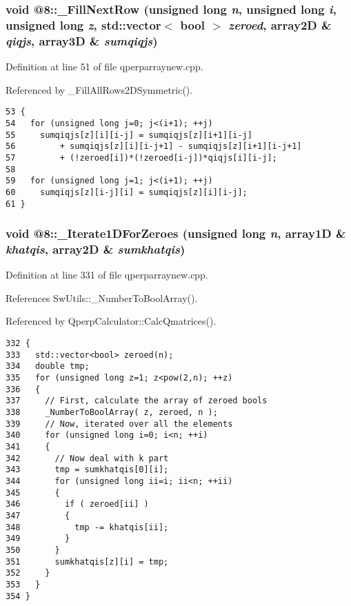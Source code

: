 \subsubsection{\setlength{\rightskip}{0pt plus 5cm}void @8::\_\-FillNextRow (unsigned long {\em n}, unsigned long {\em i}, unsigned long {\em z}, std::vector$<$ bool $>$ {\em zeroed}, array2D \& {\em qiqjs}, array3D \& {\em sumqiqjs})\hspace{0.3cm}{\tt  [static]}}\label{qperparraynew_8cpp_fa7bacdc3db3da4a62517d2518826fbc}




Definition at line 51 of file qperparraynew.cpp.

Referenced by \_\-FillAllRows2DSymmetric().

\begin{Code}\begin{verbatim}53 {
54   for (unsigned long j=0; j<(i+1); ++j)
55     sumqiqjs[z][i][i-j] = sumqiqjs[z][i+1][i-j] 
56         + sumqiqjs[z][i][i-j+1] - sumqiqjs[z][i+1][i-j+1] 
57         + (!zeroed[i])*(!zeroed[i-j])*qiqjs[i][i-j];
58 
59   for (unsigned long j=1; j<(i+1); ++j)
60     sumqiqjs[z][i-j][i] = sumqiqjs[z][i][i-j];
61 }
\end{verbatim}
\end{Code}


\subsubsection{\setlength{\rightskip}{0pt plus 5cm}void @8::\_\-Iterate1DForZeroes (unsigned long {\em n}, array1D \& {\em khatqis}, array2D \& {\em sumkhatqis})\hspace{0.3cm}{\tt  [static]}}\label{qperparraynew_8cpp_9b9808a1bf16458a7ebdf81287337ec5}




Definition at line 331 of file qperparraynew.cpp.

References SwUtils::\_\-NumberToBoolArray().

Referenced by QperpCalculator::CalcQmatrices().

\begin{Code}\begin{verbatim}332 {
333   std::vector<bool> zeroed(n);
334   double tmp;
335   for (unsigned long z=1; z<pow(2,n); ++z)
336   {
337     // First, calculate the array of zeroed bools
338     _NumberToBoolArray( z, zeroed, n );
339     // Now, iterated over all the elements
340     for (unsigned long i=0; i<n; ++i) 
341     { 
342       // Now deal with k part
343       tmp = sumkhatqis[0][i];
344       for (unsigned long ii=i; ii<n; ++ii)
345       {
346         if ( zeroed[ii] )
347         {
348           tmp -= khatqis[ii];
349         }
350       }
351       sumkhatqis[z][i] = tmp;
352     }
353   }
354 }
\end{verbatim}
\end{Code}


